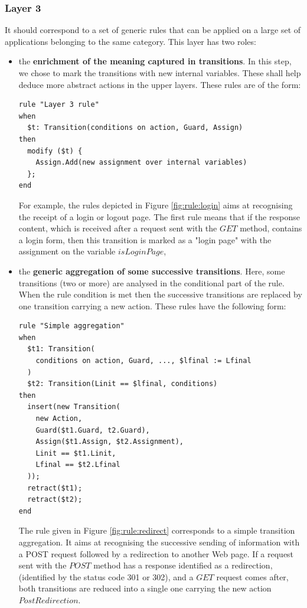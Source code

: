 \subsubsection{Layer 3}

It should correspond to a set of generic rules that can be
applied on a large set of applications belonging to the same
category. This layer has two roles:

\begin{itemize}
\item the \textbf{enrichment of the meaning captured in
transitions}. In this step, we chose to mark the transitions with
new internal variables. These shall help deduce more abstract
actions in the upper layers. These rules are of the form:

\begin{BVerbatim}
rule "Layer 3 rule"
when
  $t: Transition(conditions on action, Guard, Assign)
then
  modify ($t) {
    Assign.Add(new assignment over internal variables)
  };
end
\end{BVerbatim}

For example, the rules depicted in Figure \ref{fig:rule:login}
aims at recognising the receipt of a login or logout page. The
first rule means that if the response content, which is received
after a request sent with the $GET$ method, contains a login
form, then this transition is marked as a "login page" with the
assignment on the variable $isLoginPage$,

\item the \textbf{generic aggregation of some successive
transitions}. Here, some transitions (two or more) are analysed
in the conditional part of the rule. When the rule condition is
met then the successive transitions are replaced by one
transition carrying a new action. These rules have the following
form:

\begin{verbatim}
rule "Simple aggregation"
when
  $t1: Transition(
    conditions on action, Guard, ..., $lfinal := Lfinal
  )
  $t2: Transition(Linit == $lfinal, conditions)
then
  insert(new Transition(
    new Action,
    Guard($t1.Guard, t2.Guard),
    Assign($t1.Assign, $t2.Assignment),
    Linit == $t1.Linit,
    Lfinal == $t2.Lfinal
  ));
  retract($t1);
  retract($t2);
end
\end{verbatim}

The rule given in Figure \ref{fig:rule:redirect} corresponds to a
simple transition aggregation. It aims at recognising the
successive sending of information with a POST request followed by
a redirection to another Web page.  If a request sent with the
$POST$ method has a response identified as a redirection,
(identified by the status code 301 or 302), and  a $GET$ request
comes after, both transitions are reduced into a single one
carrying the new action $PostRedirection$.
\end{itemize}

